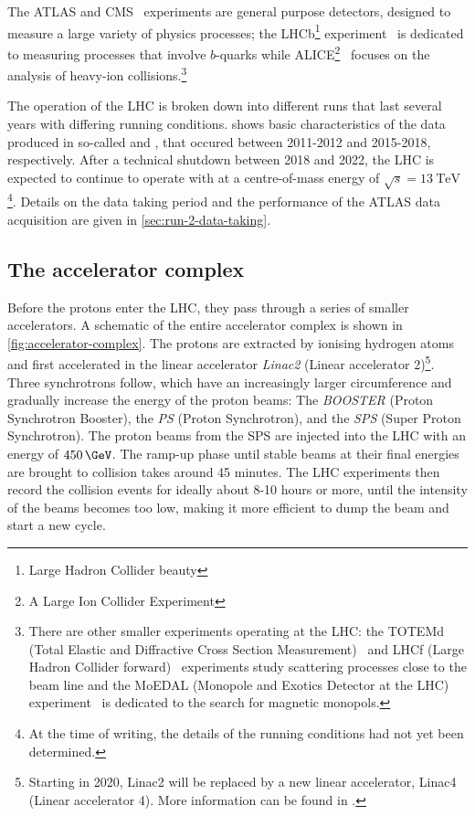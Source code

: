 The ATLAS and CMS~\cite{CMS-TDR-08-001} experiments are general purpose detectors, designed to measure a large variety of physics processes; the LHCb\footnote{Large Hadron Collider beauty} experiment~\cite{1748-0221-3-08-S08005} is dedicated to measuring processes that involve $b$-quarks while ALICE\footnote{A Large Ion Collider Experiment}~\cite{1748-0221-3-08-S08002} focuses on the analysis of heavy-ion collisions.\footnote{There are other smaller experiments operating at the LHC: the TOTEMd (Total Elastic and Diffractive Cross Section Measurement)~\cite{1748-0221-3-08-S08007} and LHCf (Large Hadron Collider forward)~\cite{1748-0221-3-08-S08006} experiments study scattering processes close to the beam line and the MoEDAL (Monopole and Exotics Detector at the LHC) experiment~\cite{1742-6596-631-1-012014} is dedicated to the search for magnetic monopols.}


The operation of the LHC is broken down into different runs that last several years with differing running conditions.
 shows basic characteristics of the data produced in so-called \RunOne and \RunTwo, that occured between 2011-2012 and 2015-2018, respectively. After a technical shutdown between 2018 and 2022, the LHC is expected to continue to operate with \RunThr at a centre-of-mass energy of  $\sqrt{s} = \SI{13}{\TeV}$\footnote{At the time of writing, the details of the \RunThr running conditions had not yet been determined.}.
Details on the \RunTwo data taking period and the performance of the ATLAS data acquisition are given in \cref{sec:run-2-data-taking}.




\subsection{The accelerator complex}
Before the protons enter the LHC, they pass through a series of smaller accelerators. A schematic of the entire accelerator complex is shown in \cref{fig:accelerator-complex}.
The protons are extracted by ionising hydrogen atoms and first accelerated in the linear accelerator \emph{Linac2} (Linear accelerator 2)\footnote{Starting in 2020, Linac2 will be replaced by a new linear accelerator, Linac4 (Linear accelerator 4). More information can be found in .}. Three synchrotrons follow, which have an increasingly larger circumference and gradually increase the energy of the proton beams: The \emph{BOOSTER} (Proton Synchrotron Booster), the \emph{PS} (Proton Synchrotron), and the \emph{SPS} (Super Proton Synchrotron). The proton beams from the SPS are injected into the LHC with an energy of $450\,\GeV$. The ramp-up phase until stable beams at their final energies are brought to collision takes around 45 minutes. The LHC experiments then record the collision events for ideally about 8-10 hours or more, until the intensity of the beams becomes too low, making it more efficient to dump the beam and start a new cycle.

